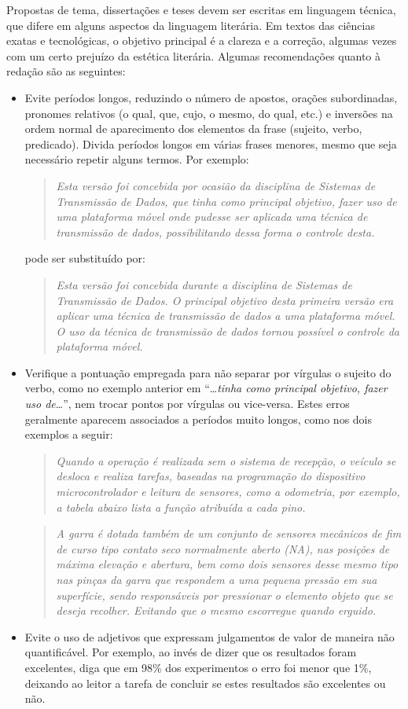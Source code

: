 Propostas de tema, dissertações e teses devem ser escritas em
linguagem técnica, que difere em alguns aspectos da linguagem
literária.  Em textos das ciências exatas e tecnológicas, o objetivo
principal é a clareza e a correção, algumas vezes com um certo
prejuízo da estética literária. Algumas recomendações quanto à
redação são as seguintes:
\begin{itemize}
\item Evite períodos longos, reduzindo o número de apostos, orações
subordinadas, pronomes relativos (o qual, que, cujo, o mesmo, do qual,
etc.) e inversões na ordem normal de aparecimento dos elementos da
frase (sujeito, verbo, predicado). Divida períodos longos em várias
frases menores, mesmo que seja necessário repetir alguns termos. Por
exemplo:
\begin{quotation}
\emph{Esta versão foi concebida por ocasião da disciplina de Sistemas
de Transmissão de Dados, que tinha como principal objetivo, fazer uso
de uma plataforma móvel onde pudesse ser aplicada uma técnica de
transmissão de dados, possibilitando dessa forma o controle desta.}
\end{quotation}
pode ser substituído por:
\begin{quotation}
\emph{Esta versão foi concebida durante a disciplina de Sistemas de
Transmissão de Dados. O principal objetivo desta primeira versão
era aplicar uma técnica de transmissão de dados a uma plataforma
móvel. O uso da técnica de transmissão de dados tornou possível
o controle da plataforma móvel.}
\end{quotation}
\item Verifique a pontuação empregada para não separar por vírgulas
o sujeito do verbo, como no exemplo anterior em ``\dots\emph{tinha
como principal objetivo, fazer uso de}\dots'', nem trocar pontos por
vírgulas ou vice-versa. Estes erros geralmente aparecem associados a
períodos muito longos, como nos dois exemplos a seguir:
\begin{quotation}
\emph{Quando a operação é realizada sem o sistema de recepção, o
veículo se desloca e realiza tarefas, baseadas na programação do
dispositivo microcontrolador e leitura de sensores, como a odometria,
por exemplo, a tabela abaixo lista a função atribuída a cada pino.}
\end{quotation}
\begin{quotation}
\emph{A garra é dotada também de um conjunto de sensores mecânicos
de fim de curso tipo contato seco normalmente aberto (NA), nas
posições de máxima elevação e abertura, bem como dois sensores desse
mesmo tipo nas pinças da garra que respondem a uma pequena pressão em
sua superfície, sendo responsáveis por pressionar o elemento objeto
que se deseja recolher. Evitando que o mesmo escorregue quando
erguido.}
\end{quotation}
\item Evite o uso de adjetivos que expressam julgamentos de valor de
maneira não quantificável. Por exemplo, ao invés de dizer que os
resultados foram excelentes, diga que em 98\% dos experimentos o erro
foi menor que 1\%, deixando ao leitor a tarefa de concluir se estes
resultados são excelentes ou não.
\end{itemize}

